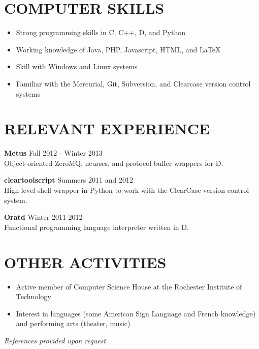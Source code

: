 \documentclass[line]{res}
\begin{document}
\begin{resume}
\section{COMPUTER SKILLS}
	\begin{itemize}[leftmargin=10pt]
	\item Strong programming skills in C, C++, D, and Python
	\item Working knowledge of Java, PHP, Javascript, HTML, and LaTeX
	\item Skill with Windows and Linux systems
	\item Familiar with the Mercurial, Git, Subversion, and Clearcase version control systems
	\end{itemize}

\section{RELEVANT EXPERIENCE}
	\textbf{Metus}
	\hfill
	Fall 2012 - Winter 2013
	\\
	Object-oriented ZeroMQ, ncurses, and protocol buffer wrappers for D.
	
	\textbf{cleartoolscript}
	\hfill
	Summers 2011 and 2012
	\\
	High-level shell wrapper in Python to work with the ClearCase version control system.
	
	\textbf{Oratd}
	\hfill
	Winter 2011-2012
	\\
	Functional programming language interpreter written in D.

\section{OTHER ACTIVITIES}
	\begin{itemize}[leftmargin=10pt]
	\item Active member of Computer Science House at the Rochester Institute of Technology
	\item Interest in languages (some American Sign Language and French knowledge) and performing arts (theater, music)
	\end{itemize}

\begin{center}
\vspace{-0.26in}\hspace{-0.8in}\emph{References provided upon request\\[8pt]}
\end{center}

\end{resume}
\end{document}

